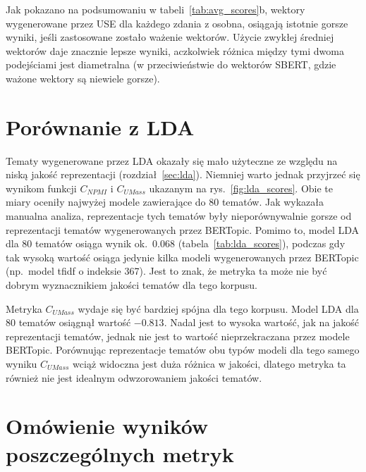 		Jak pokazano na podsumowaniu w tabeli~\ref{tab:avg_scores}b, wektory wygenerowane przez USE dla każdego zdania z osobna, osiągają istotnie gorsze wyniki,
			jeśli zastosowane zostało ważenie wektorów.
		Użycie zwykłej średniej wektorów daje znacznie lepsze wyniki, aczkolwiek różnica między tymi dwoma podejściami jest diametralna
			(w przeciwieństwie do wektorów SBERT, gdzie ważone wektory są niewiele gorsze).
	
\section{Porównanie z LDA}
	Tematy wygenerowane przez LDA okazały się mało użyteczne ze względu na niską jakość reprezentacji (rozdział~\ref{sec:lda}).
	Niemniej warto jednak przyjrzeć się wynikom funkcji \(C_{NPMI}\) i \(C_{UMass}\) ukazanym na rys.~\ref{fig:lda_scores}.
	Obie te miary oceniły najwyżej modele zawierające do 80 tematów.
	Jak wykazała manualna analiza, reprezentacje tych tematów były nieporównywalnie gorsze od reprezentacji tematów wygenerowanych przez BERTopic.
	Pomimo to, model LDA dla 80 tematów osiąga wynik ok.~0.068 (tabela~\ref{tab:lda_scores}),
		podczas gdy tak wysoką wartość osiąga jedynie kilka modeli wygenerowanych przez BERTopic (np.~model tfidf o indeksie 367).
	Jest to znak, że metryka ta może nie być dobrym wyznacznikiem jakości tematów dla tego korpusu.

	Metryka \(C_{UMass}\) wydaje się być bardziej spójna dla tego korpusu.
	Model LDA dla 80 tematów osiągnął wartość \(-0.813\).
	Nadal jest to wysoka wartość, jak na jakość reprezentacji tematów, jednak nie jest to wartość nieprzekraczana przez modele BERTopic.
	Porównując reprezentacje tematów obu typów modeli dla tego samego wyniku \(C_{UMass}\) wciąż widoczna jest duża różnica w jakości,
		dlatego metryka ta również nie jest idealnym odwzorowaniem jakości tematów.
	
\section{Omówienie wyników poszczególnych metryk}